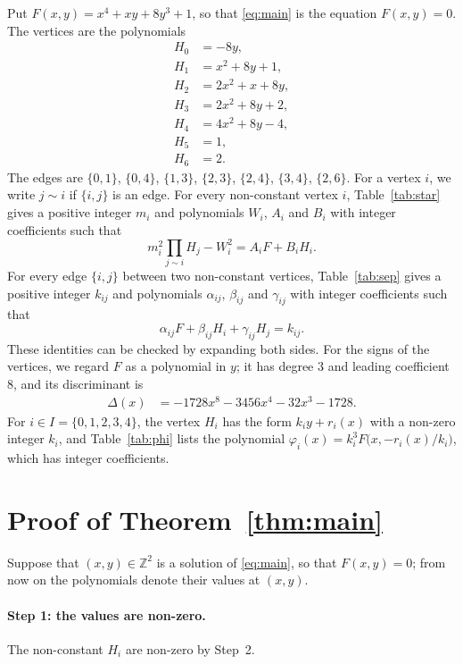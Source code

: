 \documentclass[11pt]{article}
\newcommand{\Z}{\mathbb{Z}}
\begin{document}
Put $F(x,y)=x^{4}+xy+8y^{3}+1$, so that \eqref{eq:main} is the equation $F(x,y)=0$. The vertices are the polynomials
\begin{align*}
H_{0}&=-8y,\\
H_{1}&=x^{2}+8y+1,\\
H_{2}&=2x^{2}+x+8y,\\
H_{3}&=2x^{2}+8y+2,\\
H_{4}&=4x^{2}+8y-4,\\
H_{5}&=1,\\
H_{6}&=2.
\end{align*}
The edges are $\{0,1\}$, $\{0,4\}$, $\{1,3\}$, $\{2,3\}$, $\{2,4\}$, $\{3,4\}$, $\{2,6\}$. For a vertex $i$, we write $j\sim i$ if $\{i,j\}$ is an edge.
For every non-constant vertex $i$, Table~\ref{tab:star} gives a positive integer $m_{i}$ and polynomials $W_{i}$, $A_{i}$ and $B_{i}$ with integer coefficients such that
\begin{equation}\label{eq:star}
m_i^2\prod_{j\sim i}H_j-W_i^2=A_iF+B_iH_i.
\end{equation}
For every edge $\{i,j\}$ between two non-constant vertices, Table~\ref{tab:sep} gives a positive integer $k_{ij}$ and polynomials $\alpha_{ij}$, $\beta_{ij}$ and $\gamma_{ij}$ with integer coefficients such that
\begin{equation}\label{eq:sep}
\alpha_{ij}F+\beta_{ij}H_i+\gamma_{ij}H_j=k_{ij}.
\end{equation}
These identities can be checked by expanding both sides.
For the signs of the vertices, we regard $F$ as a polynomial in $y$; it has degree $3$ and leading coefficient $8$, and its discriminant is
\begin{align*}
\Delta(x)&=-1728x^{8}-3456x^{4}-32x^{3}-1728.
\end{align*}
For $i\in I=\{0,\allowbreak 1,\allowbreak 2,\allowbreak 3,\allowbreak 4\}$, the vertex $H_i$ has the form $k_iy+r_i(x)$ with a non-zero integer $k_i$, and Table~\ref{tab:phi} lists the polynomial $\varphi_i(x)=k_i^3F\bigl(x,-r_i(x)/k_i\bigr)$, which has integer coefficients.

\section{Proof of Theorem~\ref{thm:main}}

Suppose that $(x,y)\in\Z^2$ is a solution of \eqref{eq:main}, so that $F(x,y)=0$; from now on the polynomials denote their values at $(x,y)$.
\paragraph{Step 1: the values are non-zero.} The non-constant $H_i$ are non-zero by Step~2.
\end{document}
